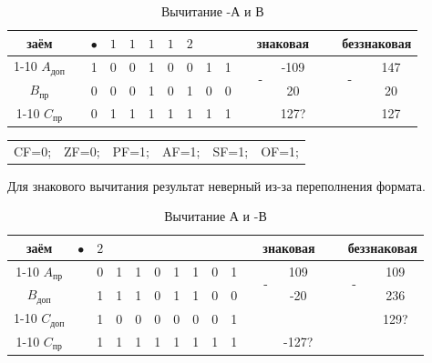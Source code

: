 \begin{table}[H]
    \centering
    \caption{Вычитание -А и В}
    \begin{tabular}{c|cc|cccccccp{1cm}ccp{0.5cm}cc}
		\small заём & & $\bullet$ & $1$ & $1$ & $1$ & $1$ & $2$ & & & & \multicolumn{2}{c}{знаковая} & \  & \multicolumn{2}{c}{беззнаковая}  \\
		\cline{1-10} \cline{12-13} \cline{15-16}
		$A_{\text{доп}}$ & & 1 & 0 & 0 & 1 & 0 & 0 & 1 & 1 & & \multirow{2}{*}{-} & -109 & \  & \multirow{2}{*}{-} & 147   \\
		$B_{\text{пр}}$ & & 0 & 0 & 0 & 1 & 0 & 1 & 0 & 0 & & & 20 & \  &  & 20 \\
		\cline{1-10} \cline{12-13} \cline{15-16}
		$C_{\text{пр}}$ & & 0 & 1 & 1 & 1 & 1 & 1 & 1 & 1 & & & 127? & \  &  & 127 \\
    \end{tabular}
\end{table}

\begin{table}[H]
    \centering
    \begin{tabular}{cccccc}
        CF=0; & ZF=0; & PF=1; & AF=1; & SF=1; & OF=1;
    \end{tabular}
\end{table}

Для знакового вычитания результат неверный из-за переполнения формата.

\begin{table}[H]
    \centering
    \caption{Вычитание А и -В}
    \begin{tabular}{c|cc|cccccccp{1cm}ccp{0.5cm}cc}
		\small заём & $\bullet$ & $2$ &  &  &  &  & & & & & \multicolumn{2}{c}{знаковая} & \  & \multicolumn{2}{c}{беззнаковая}  \\
		\cline{1-10} \cline{12-13} \cline{15-16}
		$A_{\text{пр}}$ & & 0 & 1 & 1 & 0 & 1 & 1 & 0 & 1 & & \multirow{2}{*}{-} & 109 & \  & \multirow{2}{*}{-} & 109\\
		$B_{\text{доп}}$ & & 1 & 1 & 1 & 0 & 1 & 1 & 0 & 0 & & & -20 & \  &  & 236 \\
		\cline{1-10} \cline{12-13} \cline{15-16}
		$C_{\text{доп}}$ & & 1 & 0 & 0 & 0 & 0 & 0 & 0 & 1 & & & & \  &  & 129?\\
		\cline{1-10} \cline{12-13} \cline{15-16}
		$C_{\text{пр}}$ & & 1 & 1 & 1 & 1 & 1 & 1 & 1 & 1 & & & -127? & \  &  & \\
    \end{tabular}
\end{table}

